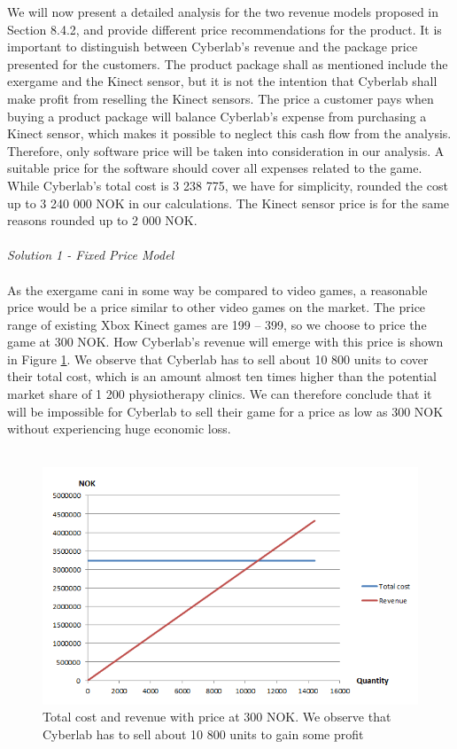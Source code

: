 We will now present a detailed analysis for the two revenue models proposed in Section 8.4.2, and provide different price recommendations for the product. It is important to distinguish between Cyberlab's revenue and the package price presented for the customers. The product package shall as mentioned include the exergame and the Kinect sensor, but it is not the intention that Cyberlab shall make profit from reselling the Kinect sensors. The price a customer pays when buying a product package will balance Cyberlab's expense from purchasing a Kinect sensor, which makes it possible to neglect this cash flow from the analysis. Therefore, only software price will be taken into consideration in our analysis. A suitable price for the software should cover all expenses related to the game. While Cyberlab's total cost is 3 238 775, we have for simplicity,  rounded the cost up to 3 240 000 NOK in our calculations. The Kinect sensor price is for the same reasons rounded up to 2 000 NOK. \\ \\ 
\emph{Solution 1 - Fixed Price Model}\\ \\
As the exergame cani in some way be compared to video games, a reasonable price would be a price similar to other video games on the market. The price range of existing Xbox Kinect games are 199 – 399, so we choose to price the game at 300 NOK. How Cyberlab’s revenue will emerge with this price is shown in Figure \ref{fig:FixedLowPrice}. We observe that Cyberlab has to sell about 10 800 units to cover their total cost, which is an amount almost ten times higher than the potential market share of 1 200 physiotherapy clinics. We can therefore conclude that it will be impossible for Cyberlab to sell their game for a price as low as 300 NOK without experiencing huge economic loss.\\ \\
\begin{figure}
\begin{center}
\includegraphics[scale=0.7]{fixedlowprice}
\caption[Price related to commercial video games]{Total cost and revenue with price at 300 NOK. We observe that Cyberlab has to sell about 10 800 units to gain some profit}
\label{fig:FixedLowPrice}
\end{center}
\end{figure}
